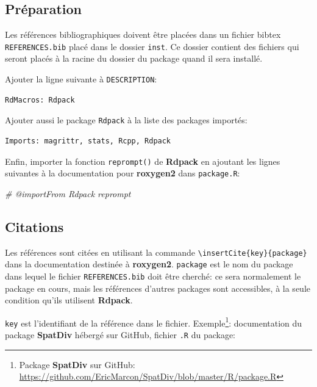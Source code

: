 \documentclass[
  11pt,
  french,
  a4paper,
  extrafontsizes,onecolumn,openright
  ]{memoir}
\newenvironment{Shaded}{\begin{snugshade}}{\end{snugshade}}
\newcommand{\CommentTok}[1]{\textcolor[rgb]{0.56,0.35,0.01}{\textit{#1}}}
\begin{document}
\hypertarget{pruxe9paration}{%
\subsection{Préparation}\label{pruxe9paration}}

Les références bibliographiques doivent être placées dans un fichier bibtex \texttt{REFERENCES.bib} placé dans le dossier \texttt{inst}.
Ce dossier contient des fichiers qui seront placés à la racine du dossier du package quand il sera installé.

Ajouter la ligne suivante à \texttt{DESCRIPTION}:

\begin{verbatim}
RdMacros: Rdpack
\end{verbatim}

Ajouter aussi le package \texttt{Rdpack} à la liste des packages importés:

\begin{verbatim}
Imports: magrittr, stats, Rcpp, Rdpack
\end{verbatim}

Enfin, importer la fonction \texttt{reprompt()} de \textbf{Rdpack} en ajoutant les lignes suivantes à la documentation pour \textbf{roxygen2} dans \texttt{package.R}:

\scriptsize

\begin{Shaded}
\begin{Highlighting}[]
\CommentTok{\#\textquotesingle{} @importFrom Rdpack reprompt}
\end{Highlighting}
\end{Shaded}

\normalsize

\hypertarget{citations}{%
\subsection{Citations}\label{citations}}

Les références sont citées en utilisant la commande \texttt{\textbackslash{}insertCite\{key\}\{package\}} dans la documentation destinée à \textbf{roxygen2}.
\texttt{package} est le nom du package dans lequel le fichier \texttt{REFERENCES.bib} doit être cherché: ce sera normalement le package en cours, mais les références d'autres packages sont accessibles, à la seule condition qu'ils utilisent \textbf{Rdpack}.

\texttt{key} est l'identifiant de la référence dans le fichier.
Exemple\footnote{Package \textbf{SpatDiv} sur GitHub: \url{https://github.com/EricMarcon/SpatDiv/blob/master/R/package.R}}: documentation du package \textbf{SpatDiv} hébergé sur GitHub, fichier \texttt{.R} du package:
\end{document}
